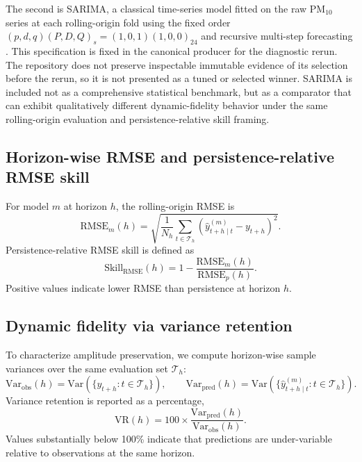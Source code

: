 \documentclass{article}
\begin{document}
The second is SARIMA, a classical time-series model fitted on the raw PM$_{10}$
series at each rolling-origin fold using the fixed order
$(p,d,q)(P,D,Q)_s = (1,0,1)(1,0,0)_{24}$ and recursive multi-step forecasting
\citep{boxjenkins2015}.
This specification is fixed in the canonical producer for the diagnostic
rerun.  The repository does not preserve inspectable immutable evidence of its
selection before the rerun, so it is not presented as a tuned or selected
winner.
SARIMA is included not as a comprehensive statistical benchmark, but as a
comparator that can exhibit qualitatively different dynamic-fidelity behavior
under the same rolling-origin evaluation and persistence-relative skill framing.

\subsection{Horizon-wise RMSE and persistence-relative RMSE skill}

For model $m$ at horizon $h$, the rolling-origin RMSE is
\begin{equation}
  \mathrm{RMSE}_m(h) = \sqrt{\frac{1}{N_h}\sum_{t \in \mathcal{T}_h}
  \left(\hat{y}^{(m)}_{t+h\mid t}-y_{t+h}\right)^2}.
\end{equation}
Persistence-relative RMSE skill is defined as
\begin{equation}
  \mathrm{Skill}_{\mathrm{RMSE}}(h) = 1 -
  \frac{\mathrm{RMSE}_m(h)}{\mathrm{RMSE}_p(h)}.
\end{equation}
Positive values indicate lower RMSE than persistence at horizon $h$.

\subsection{Dynamic fidelity via variance retention}

To characterize amplitude preservation, we compute horizon-wise sample
variances over the same evaluation set $\mathcal{T}_h$:
\begin{equation}
  \mathrm{Var}_{\mathrm{obs}}(h)=
  \mathrm{Var}\!\left(\{y_{t+h}: t\in\mathcal{T}_h\}\right),
  \qquad
  \mathrm{Var}_{\mathrm{pred}}(h)=
  \mathrm{Var}\!\left(\{\hat{y}^{(m)}_{t+h\mid t}: t\in\mathcal{T}_h\}\right).
\end{equation}
Variance retention is reported as a percentage,
\begin{equation}
  \mathrm{VR}(h) = 100 \times
  \frac{\mathrm{Var}_{\mathrm{pred}}(h)}{\mathrm{Var}_{\mathrm{obs}}(h)}.
\end{equation}
Values substantially below 100\% indicate that predictions are under-variable
relative to observations at the same horizon.
\end{document}
